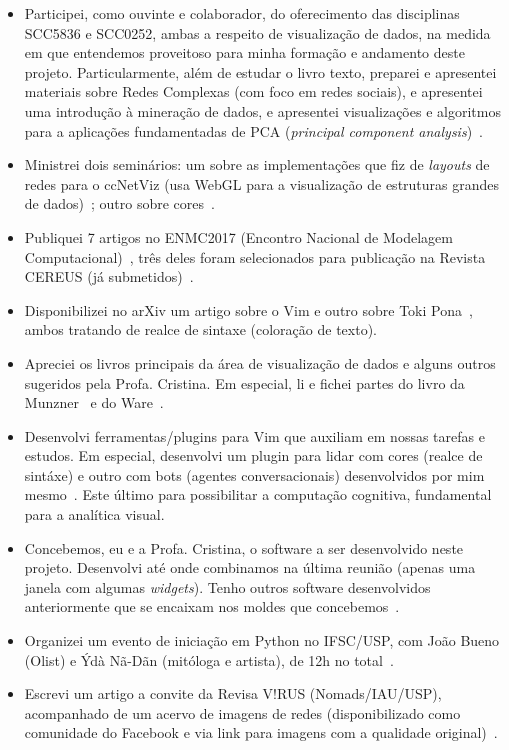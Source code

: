 \documentclass[a4paper, 11pt]{article}
\begin{document}
\begin{itemize}
  \item Participei, como ouvinte e colaborador, do oferecimento das disciplinas SCC5836 e SCC0252, ambas a respeito de visualização de dados, na medida em que entendemos proveitoso para minha formação e andamento deste projeto.
    Particularmente, além de estudar o livro texto, preparei e apresentei materiais sobre Redes Complexas (com foco em redes sociais), e apresentei uma introdução à mineração de dados, e apresentei visualizações e algoritmos para a aplicações fundamentadas de PCA (\emph{principal component analysis})~\cite{slidesDV}.
  \item Ministrei dois seminários: um sobre as implementações que fiz de \emph{layouts} de redes para o ccNetViz (usa WebGL para a visualização de estruturas grandes de dados)~\cite{sem1}; outro sobre cores~\cite{sem2}.
  \item Publiquei 7 artigos no ENMC2017 (Encontro Nacional de Modelagem Computacional)~\cite{e1,e2,e3,e4,e5,e6,e7}, três deles foram selecionados para publicação na Revista CEREUS (já submetidos)~\cite{e2,e3,e4}.
  \item Disponibilizei no arXiv um artigo sobre o Vim e outro sobre Toki Pona~\cite{arxiv}, ambos tratando de realce de sintaxe (coloração de texto).
  \item Apreciei os livros principais da área de visualização de dados e alguns outros sugeridos pela Profa. Cristina. Em especial, li e fichei partes do livro da Munzner~\cite{munzner} e do Ware~\cite{ware}.
  \item Desenvolvi ferramentas/plugins para Vim que auxiliam em nossas tarefas e estudos. Em especial, desenvolvi um plugin para lidar com cores (realce de sintáxe) e outro com bots (agentes conversacionais) desenvolvidos por mim mesmo~\cite{prv}. Este último para possibilitar a computação cognitiva, fundamental para a analítica visual.
  \item Concebemos, eu e a Profa. Cristina, o software a ser desenvolvido neste projeto. Desenvolvi até onde combinamos na última reunião (apenas uma janela com algumas \emph{widgets}). Tenho outros software desenvolvidos anteriormente que se encaixam nos moldes que concebemos~\cite{repos}.
  \item Organizei um evento de iniciação em Python no IFSC/USP, com João Bueno (Olist) e Ýdà Nã-Dãn (mitóloga e artista), de 12h no total~\cite{bueno}.
  \item Escrevi um artigo a convite da Revisa V!RUS (Nomads/IAU/USP), acompanhado de um acervo de imagens de redes (disponibilizado como comunidade do Facebook e via link para imagens com a qualidade original)~\cite{virus}.

\end{itemize}
\end{document}
